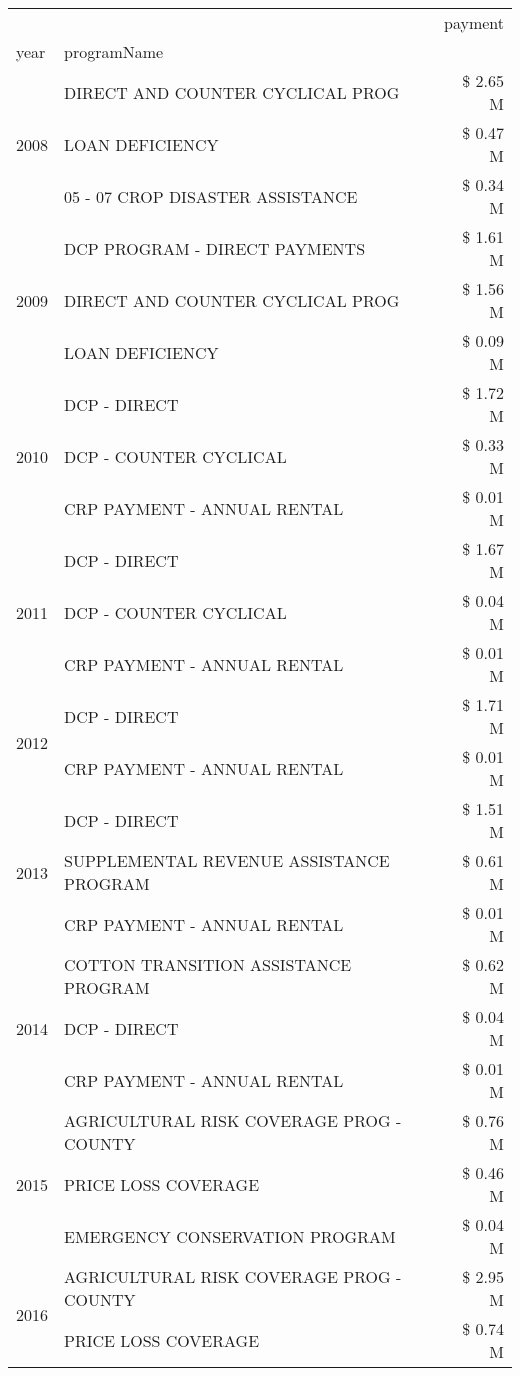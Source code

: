 \begin{tabular}{llr}
\toprule
 &  & payment \\
year & programName &  \\
\midrule
\multirow[t]{3}{*}{2008} & DIRECT AND COUNTER CYCLICAL PROG & \$ 2.65 M \\
 & LOAN DEFICIENCY & \$ 0.47 M \\
 & 05 - 07 CROP DISASTER ASSISTANCE & \$ 0.34 M \\
\cline{1-3}
\multirow[t]{3}{*}{2009} & DCP PROGRAM - DIRECT PAYMENTS & \$ 1.61 M \\
 & DIRECT AND COUNTER CYCLICAL PROG & \$ 1.56 M \\
 & LOAN DEFICIENCY & \$ 0.09 M \\
\cline{1-3}
\multirow[t]{3}{*}{2010} & DCP - DIRECT & \$ 1.72 M \\
 & DCP - COUNTER CYCLICAL & \$ 0.33 M \\
 & CRP PAYMENT - ANNUAL RENTAL & \$ 0.01 M \\
\cline{1-3}
\multirow[t]{3}{*}{2011} & DCP - DIRECT & \$ 1.67 M \\
 & DCP - COUNTER CYCLICAL & \$ 0.04 M \\
 & CRP PAYMENT - ANNUAL RENTAL & \$ 0.01 M \\
\cline{1-3}
\multirow[t]{2}{*}{2012} & DCP - DIRECT & \$ 1.71 M \\
 & CRP PAYMENT - ANNUAL RENTAL & \$ 0.01 M \\
\cline{1-3}
\multirow[t]{3}{*}{2013} & DCP - DIRECT & \$ 1.51 M \\
 & SUPPLEMENTAL REVENUE ASSISTANCE PROGRAM & \$ 0.61 M \\
 & CRP PAYMENT - ANNUAL RENTAL & \$ 0.01 M \\
\cline{1-3}
\multirow[t]{3}{*}{2014} & COTTON TRANSITION ASSISTANCE PROGRAM & \$ 0.62 M \\
 & DCP - DIRECT & \$ 0.04 M \\
 & CRP PAYMENT - ANNUAL RENTAL & \$ 0.01 M \\
\cline{1-3}
\multirow[t]{3}{*}{2015} & AGRICULTURAL RISK COVERAGE PROG - COUNTY & \$ 0.76 M \\
 & PRICE LOSS COVERAGE & \$ 0.46 M \\
 & EMERGENCY CONSERVATION PROGRAM & \$ 0.04 M \\
\cline{1-3}
\multirow[t]{3}{*}{2016} & AGRICULTURAL RISK COVERAGE PROG - COUNTY & \$ 2.95 M \\
 & PRICE LOSS COVERAGE & \$ 0.74 M \\

\end{tabular}
